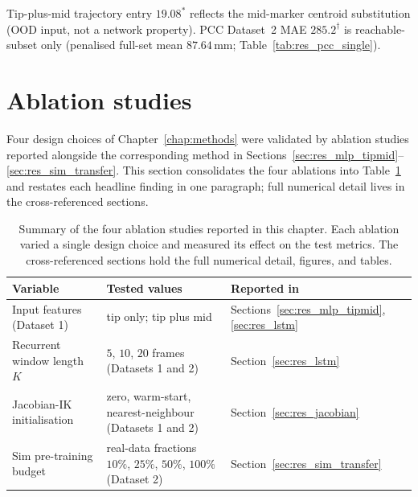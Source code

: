 Tip-plus-mid trajectory entry $19.08^{\ast}$ reflects the mid-marker centroid substitution (OOD input, not a network property). PCC Dataset~2 MAE $285.2^{\dagger}$ is reachable-subset only (penalised full-set mean $87.64$\,mm; Table~\ref{tab:res_pcc_single}).

\section{Ablation studies}
\label{sec:res_ablation}

Four design choices of Chapter~\ref{chap:methods} were validated by ablation studies reported alongside the corresponding method in Sections~\ref{sec:res_mlp_tipmid}--\ref{sec:res_sim_transfer}. This section consolidates the four ablations into Table~\ref{tab:res_ablation} and restates each headline finding in one paragraph; full numerical detail lives in the cross-referenced sections.

\begin{table}[ht]
\centering
\caption[Ablation studies consolidated across Chapter 4.]{Summary of the four ablation studies reported in this chapter. Each ablation varied a single design choice and measured its effect on the test metrics. The cross-referenced sections hold the full numerical detail, figures, and tables.}
\label{tab:res_ablation}
\begin{tabularx}{\linewidth}{@{}l X X@{}}
\toprule
Variable                            & Tested values                                                           & Reported in                                  \\
\midrule
Input features (Dataset 1)           & tip only; tip plus mid                                                  & Sections~\ref{sec:res_mlp_tipmid}, \ref{sec:res_lstm} \\
Recurrent window length $K$          & $5$, $10$, $20$ frames (Datasets 1 and 2)                               & Section~\ref{sec:res_lstm}                    \\
Jacobian-IK initialisation           & zero, warm-start, nearest-neighbour (Datasets 1 and 2)                  & Section~\ref{sec:res_jacobian}                \\
Sim pre-training budget              & real-data fractions $10\%$, $25\%$, $50\%$, $100\%$ (Dataset 2)          & Section~\ref{sec:res_sim_transfer}            \\
\bottomrule
\end{tabularx}
\end{table}

